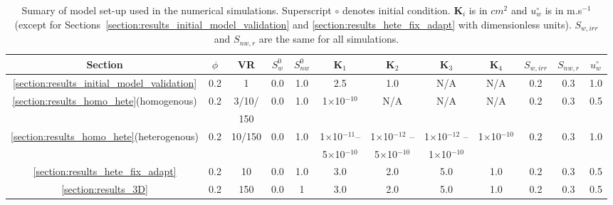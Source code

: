 \begin{landscape}
\begin{table}
  \begin{tabular}{c | c c  c  c  c  c  c  c  c  c   c}
    \hline
      {\bf Section} & $\phi$ & VR  & $S^{0}_{w}$ & $S^{0}_{nw}$ & $\mathbf{K}_{1}$ & $\mathbf{K}_{2}$ & $\mathbf{K}_{3}$ & $\mathbf{K}_{4}$ & $S_{w,irr}$ & $S_{nw,r}$ & $u^{\circ}_{w}$ \\ 
    \hline
     \ref{section:results_initial_model_validation} & 0.2 & 1 & 0.0 & 1.0 & 2.5 & 1.0 & N/A & N/A & 0.2 & 0.3 & 1.0 \\
     \ref{section:results_homo_hete}(homogenous)  & 0.2 & 3/10/ & 0.0 & 1.0 & 1$\times$10$^{-10}$ & N/A & N/A & N/A & 0.2 & 0.3 & 0.5  \\
                                                  &     & 150 &     &     &                    &     &     &     &     &     &      \\
     \ref{section:results_homo_hete}(heterogenous) & 0.2 & 10/150 & 0.0 & 1.0 & 1$\times$10$^{-11} $-- & 1$\times$10$^{-12}$ -- & 1$\times$10$^{-12}$ -- & 1$\times$10$^{-10}$ & 0.2  & 0.3 & 1.0 \\
      &   &  &  &  & 5$\times$10$^{-10}$ & 5$\times$10$^{-10}$ & 1$\times$10$^{-10}$  &  &  &  & \\
     \ref{section:results_hete_fix_adapt}  & 0.2 & 10 & 0.0 & 1.0  & 3.0 & 2.0 & 5.0 & 1.0 & 0.2 & 0.3 & 0.5  \\
     \ref{section:results_3D}  & 0.2 & 150 & 0.0 & 1 & 3.0 & 2.0 & 5.0 & 1.0 & 0.2  & 0.3 & 0.5  \\
     \hline
   \end{tabular}
   \caption{Sumary of model set-up used in the numerical simulations. Superscript $\circ$ denotes initial condition. $\mathbf{K}_{i}$ is in $cm^{2}$ and $u^{\circ}_{w}$ is in m.s$^{-1}$ (except for Sections~\ref{section:results_initial_model_validation} and \ref{section:results_hete_fix_adapt} with dimensionless units). $S_{w,irr}$ and $S_{nw,r}$ are the same for all simulations. }
\label{table:setup}
\end{table}
\end{landscape}
\clearpage


